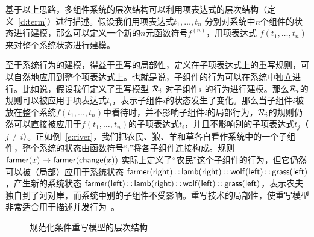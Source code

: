 基于以上思路，多组件系统的层次结构可以利用项表达式的层次结构（定义~\ref{d:term}）进行描述。假设我们用项表达式$t_1,\ldots,t_n$ 分别对系统中$n$个组件的状态进行建模，那么可以定义一个新的$n$元函数符号$f^{(n)}$，用项表达式 $f(t_1,\ldots,t_n)$ 来对整个系统状态进行建模。

至于系统行为的建模，得益于重写的局部性，定义在子项表达式上的重写规则，可以自然地应用到整个项表达式上。也就是说，子组件的行为可以在系统中独立进行。比如说，假设我们定义了重写模型 $\cR_i$ 对子组件$i$ 的行为进行建模。那么$\cR_i$的规则可以被应用于项表达式$t_i$，表示子组件$i$的状态发生了变化。那么当子组件$i$被放在整个系统$f(t_1,\ldots,t_n)$中看待时，并不影响子组件$i$的局部行为，$\cR_i$的规则仍然可以直接被应用于$f(t_1,\ldots,t_n)$的子项表达式$t_i$，并且不影响别的子项表达式$t_j$（$j\not=i$）。正如例~\ref{e:river}，我们把农民、狼、羊和草各自看作系统中的一个子组件，整个系统的状态由函数符号“$\comp$”将各子组件连接构成。规则$\farmer(x) \ra \farmer(\change(x))$ 实际上定义了“农民”这个子组件的行为，但它仍然可以被（局部）应用于系统状态 $\farmer(\rhs) \comp \lamb(\rhs) \comp \wolf(\lhs) \comp \grass(\lhs)$，产生新的系统状态 $\farmer(\lhs) \comp \lamb(\rhs) \comp \wolf(\lhs) \comp \grass(\lhs)$，表示农夫独自到了河对岸，而系统中别的子组件不受影响。重写技术的局部性，使重写模型非常适合用于描述并发行为~\cite{DBLP:journals/tcs/Marte-OlietM02}。

\begin{figure}[ht]
\centering
{}
\caption{规范化条件重写模型的层次结构}
\label{f:layered-model}
\end{figure}

